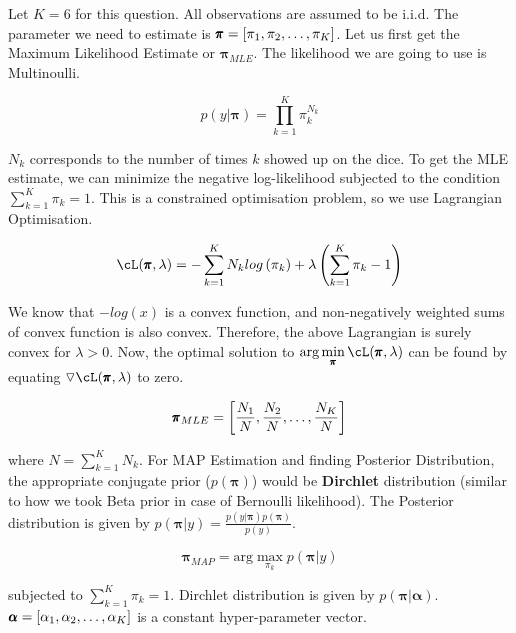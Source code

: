 \documentclass[a4paper,12pt]{article}
\begin{document}
\begin{mlsolution}

Let $K=6$ for this question. All observations are assumed to be i.i.d. The parameter we need to estimate is $\pmb{\pi} = \left[{\pi_1, \pi_2, \dots, \pi_K}\right]$. Let us first get the Maximum Likelihood Estimate or $\pmb{\pi}_{MLE}$. The likelihood we are going to use is Multinoulli.

\begin{equation*}
    p(y | \pmb{\pi}) = \prod_{k=1}^{K}\pi_k^{N_k}
\end{equation*}

$N_k$ corresponds to the number of times $k$ showed up on the dice. To get the MLE estimate, we can minimize the negative log-likelihood subjected to the condition $\sum_{k=1}^K \pi_k = 1$. This is a constrained optimisation problem, so we use Lagrangian Optimisation.

\begin{equation*}
    \cL(\pmb{\pi}, \lambda) = -\sum_{k=1}^K N_klog\br{\pi_k} + \lambda\br{\sum_{k=1}^K\pi_k - 1}
\end{equation*}

We know that $-log(x)$ is a convex function, and non-negatively weighted sums of convex function is also convex. Therefore, the above Lagrangian is surely convex for $\lambda>0$. Now, the optimal solution to $\text{arg} \min\limits_{\pmb{\pi}} \cL(\pmb{\pi}, \lambda)$ can be found by equating $\triangledown \cL(\pmb{\pi}, \lambda)$ to zero.

\begin{equation*}
    \pmb{\pi}_{MLE} = \left[{\frac{N_1}{N}, \frac{N_2}{N}, \dots, \frac{N_K}{N}}\right]
\end{equation*}

where $N = \sum_{k=1}^K N_k$. For MAP Estimation and finding Posterior Distribution, the appropriate conjugate prior ($p(\pmb{\pi})$) would be \textbf{Dirchlet} distribution (similar to how we took Beta prior in case of Bernoulli likelihood).
The Posterior distribution is given by $p(\pmb{\pi}|y) = \frac{p(y|\pmb{\pi})p(\pmb{\pi})}{p(y)}$.

\begin{equation*}
    \pmb{\pi}_{MAP} = \text{arg} \max\limits_{\pi_k} p(\pmb{\pi}|y)
\end{equation*}

subjected to $\sum_{k=1}^K \pi_k = 1$. Dirchlet distribution is given by $p(\pmb{\pi} | \pmb{\alpha})$. $\pmb{\alpha} = \left[{\alpha_1, \alpha_2, \dots, \alpha_K}\right]$ is a constant hyper-parameter vector.


\end{mlsolution}
\end{document}
